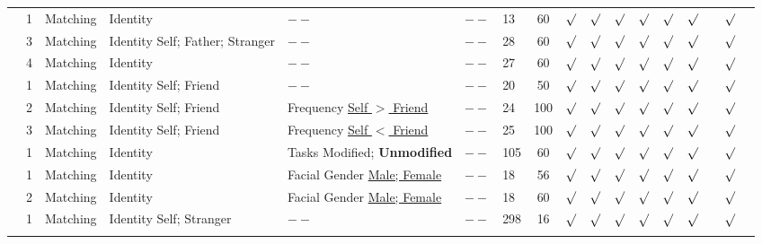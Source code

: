 \documentclass[sn-apa]{sn-jnl}%
\theoremstyle{thmstyleone}%
\theoremstyle{thmstyletwo}%
\theoremstyle{thmstylethree}%
\begin{document}
\begin{table}
\begin{tabular*}{\textwidth}{@{\extracolsep\fill}lp{0.5cm}p{1cm}p{1cm}p{1cm}cp{1cm}cccccccccc}
		 \textcite{navon2021are} & 1 & Matching & Identity\centering & $--$\centering & $--$ & 13 & 60 & $\surd$ & $\surd$ & $\surd$ & $\surd$  & $\surd$ & $\surd$ & & $\surd$ \\
		 & 3 & Matching & Identity Self; Father; Stranger\centering & $--$\centering & $--$ & 28 & 60 & $\surd$ & $\surd$ & $\surd$ & $\surd$  & $\surd$ & $\surd$ & & $\surd$ \\
		& 4 & Matching & Identity\centering & $--$\centering & $--$ & 27 & 60 & $\surd$ & $\surd$ & $\surd$ & $\surd$  & $\surd$ & $\surd$ & & $\surd$ \\
		\textcite{svensson2022more} & 1 & Matching & Identity Self; Friend\centering & $--$\centering & $--$ & 20 & 50 & $\surd$ & $\surd$ & $\surd$ & $\surd$  & $\surd$ & $\surd$ & & $\surd$ \\
		& 2 & Matching & Identity Self; Friend\centering & Frequency \underline{Self $>$ Friend}\centering  & $--$ & 24 & 100 & $\surd$ & $\surd$ & $\surd$ & $\surd$  & $\surd$ & $\surd$ & & $\surd$ \\
		& 3 & Matching & Identity Self; Friend\centering & Frequency \underline{Self $<$ Friend}\centering & $--$ & 25 & 100 & $\surd$ & $\surd$ & $\surd$ & $\surd$  & $\surd$ & $\surd$ & & $\surd$ \\
		\textcite{xu2021romantic} & 1 & Matching & Identity\centering & Tasks Modified; \textbf{Unmodified}\centering & $--$ & 105 & 60 & $\surd$ & $\surd$ & $\surd$ & $\surd$  & $\surd$ & $\surd$ & & $\surd$ \\ 
		\textcite{wozniak2018prioritization} & 1 & Matching & Identity\centering & Facial Gender \underline{Male; Female}\centering & $--$ & 18 & 56 & $\surd$ & $\surd$ & $\surd$ & $\surd$  & $\surd$ & $\surd$ & & $\surd$ \\
		& 2 & Matching & Identity\centering & Facial Gender \underline{Male; Female}\centering & $--$ & 18 & 60 & $\surd$ & $\surd$ & $\surd$ & $\surd$  & $\surd$ & $\surd$ & & $\surd$ \\  
		\textcite{liu2023to} & 1 & Matching & Identity Self; Stranger\centering & $--$\centering & $--$ & 298 & 16 & $\surd$ & $\surd$ & $\surd$ & $\surd$  & $\surd$ & $\surd$ & & $\surd$ \\
		\botrule
	\end{tabular*}
\end{table}
\clearpage
\end{document}
